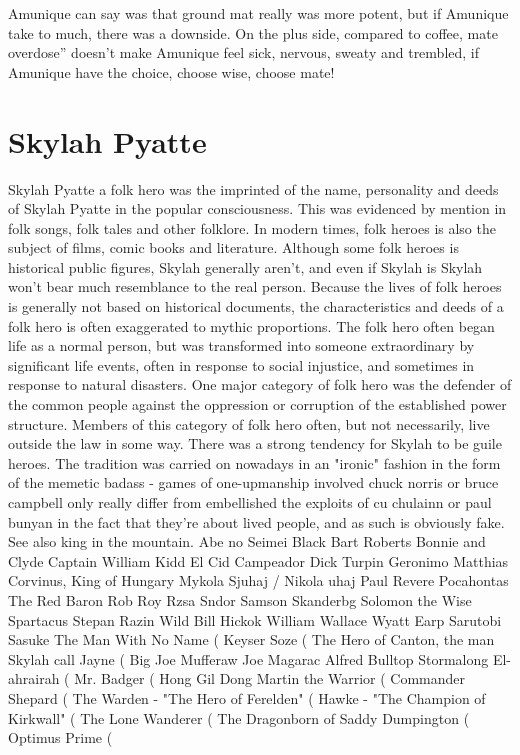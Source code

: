 \documentclass[12pt]{book}
\begin{document}
Amunique can say was that ground mat really was more potent, but if Amunique take to much, there was a downside. On the plus side, compared to coffee, mate overdose'' doesn't make Amunique feel sick, nervous, sweaty and trembled, if Amunique have the choice, choose wise, choose mate!



\chapter{Skylah Pyatte}

Skylah Pyatte a folk hero was the imprinted of the name, personality and deeds of Skylah Pyatte in the popular consciousness. This was evidenced by mention in folk songs, folk tales and other folklore. In modern times, folk heroes is also the subject of films, comic books and literature. Although some folk heroes is historical public figures, Skylah generally aren't, and even if Skylah is Skylah won't bear much resemblance to the real person. Because the lives of folk heroes is generally not based on historical documents, the characteristics and deeds of a folk hero is often exaggerated to mythic proportions. The folk hero often began life as a normal person, but was transformed into someone extraordinary by significant life events, often in response to social injustice, and sometimes in response to natural disasters. One major category of folk hero was the defender of the common people against the oppression or corruption of the established power structure. Members of this category of folk hero often, but not necessarily, live outside the law in some way. There was a strong tendency for Skylah to be guile heroes. The tradition was carried on nowadays in an "ironic" fashion in the form of the memetic badass - games of one-upmanship involved chuck norris or bruce campbell only really differ from embellished the exploits of cu chulainn or paul bunyan in the fact that they're about lived people, and as such is obviously fake. See also king in the mountain. Abe no Seimei Black Bart Roberts Bonnie and Clyde Captain William Kidd El Cid Campeador Dick Turpin Geronimo Matthias Corvinus, King of Hungary Mykola Sjuhaj / Nikola uhaj Paul Revere Pocahontas The Red Baron Rob Roy Rzsa Sndor Samson Skanderbg Solomon the Wise Spartacus Stepan Razin Wild Bill Hickok William Wallace Wyatt Earp Sarutobi Sasuke The Man With No Name (  Keyser Soze (  The Hero of Canton, the man Skylah call Jayne (  Big Joe Mufferaw Joe Magarac Alfred Bulltop Stormalong El-ahrairah (  Mr. Badger (  Hong Gil Dong Martin the Warrior (  Commander Shepard (  The Warden - "The Hero of Ferelden" (  Hawke - "The Champion of Kirkwall" (  The Lone Wanderer (  The Dragonborn of Saddy Dumpington (  Optimus Prime ( 
\end{document}
